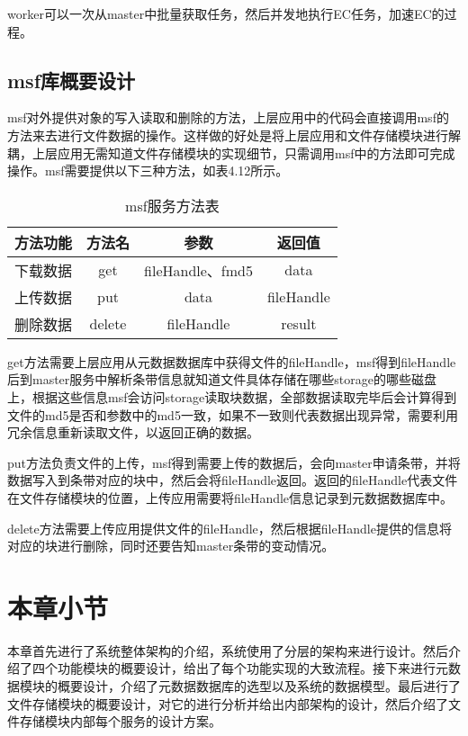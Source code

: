 worker可以一次从master中批量获取任务，然后并发地执行EC任务，加速EC的过程。

\subsection{msf库概要设计}

msf对外提供对象的写入读取和删除的方法，上层应用中的代码会直接调用msf的方法来去进行文件数据的操作。这样做的好处是将上层应用和文件存储模块进行解耦，上层应用无需知道文件存储模块的实现细节，只需调用msf中的方法即可完成操作。msf需要提供以下三种方法，如表4.12所示。

\begin{table}[h]
  \centering
  \caption{msf服务方法表}
  \begin{tabular}{cccc}
    \toprule
    方法功能   & 方法名    & 参数     & 返回值               \\
    \midrule
    下载数据      & get    & fileHandle、fmd5  & data       \\
    \addlinespace
    上传数据      & put    & data              & fileHandle \\
    \addlinespace
    删除数据      & delete & fileHandle        & result     \\
    \bottomrule
  \end{tabular}
\end{table}	

get方法需要上层应用从元数据数据库中获得文件的fileHandle，msf得到fileHandle后到master服务中解析条带信息就知道文件具体存储在哪些storage的哪些磁盘上，根据这些信息msf会访问storage读取块数据，全部数据读取完毕后会计算得到文件的md5是否和参数中的md5一致，如果不一致则代表数据出现异常，需要利用冗余信息重新读取文件，以返回正确的数据。

put方法负责文件的上传，msf得到需要上传的数据后，会向master申请条带，并将数据写入到条带对应的块中，然后会将fileHandle返回。返回的fileHandle代表文件在文件存储模块的位置，上传应用需要将fileHandle信息记录到元数据数据库中。

delete方法需要上传应用提供文件的fileHandle，然后根据fileHandle提供的信息将对应的块进行删除，同时还要告知master条带的变动情况。

\section{本章小节}
本章首先进行了系统整体架构的介绍，系统使用了分层的架构来进行设计。然后介绍了四个功能模块的概要设计，给出了每个功能实现的大致流程。接下来进行元数据模块的概要设计，介绍了元数据数据库的选型以及系统的数据模型。最后进行了文件存储模块的概要设计，对它的进行分析并给出内部架构的设计，然后介绍了文件存储模块内部每个服务的设计方案。